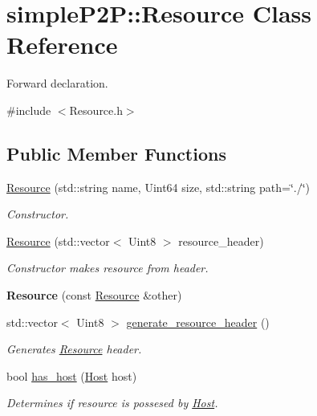 \hypertarget{classsimpleP2P_1_1Resource}{}\section{simple\+P2P\+:\+:Resource Class Reference}
\label{classsimpleP2P_1_1Resource}


Forward declaration.  




{\ttfamily \#include $<$Resource.\+h$>$}

\subsection*{Public Member Functions}
\begin{DoxyCompactItemize}
\item 
\hyperlink{classsimpleP2P_1_1Resource_a0aed54e6cf7d3a5fa2c53fe3b3b57d19}{Resource} (std\+::string name, Uint64 size, std\+::string path=\char`\"{}./\char`\"{})
\begin{DoxyCompactList}\small\item\em Constructor. \end{DoxyCompactList}\item 
\hyperlink{classsimpleP2P_1_1Resource_aa725d8f5028c2f83a088a18bcbd9318d}{Resource} (std\+::vector$<$ Uint8 $>$ resource\+\_\+header)
\begin{DoxyCompactList}\small\item\em Constructor makes resource from header. \end{DoxyCompactList}\item 
\mbox{\label{classsimpleP2P_1_1Resource_a39adea0f6c8614485c8f1bae9dfe366c}} 
{\bfseries Resource} (const \hyperlink{classsimpleP2P_1_1Resource}{Resource} \&other)
\item 
std\+::vector$<$ Uint8 $>$ \hyperlink{classsimpleP2P_1_1Resource_a87e735b9e7b48c329698c6e7aab455a8}{generate\+\_\+resource\+\_\+header} ()
\begin{DoxyCompactList}\small\item\em Generates \hyperlink{classsimpleP2P_1_1Resource}{Resource} header. \end{DoxyCompactList}\item 
bool \hyperlink{classsimpleP2P_1_1Resource_ac3c067c66ef0db0a25a7904a83f50e3d}{has\+\_\+host} (\hyperlink{classsimpleP2P_1_1Host}{Host} host)
\begin{DoxyCompactList}\small\item\em Determines if resource is possesed by \hyperlink{classsimpleP2P_1_1Host}{Host}. \end{DoxyCompactList}\item 

\end{DoxyCompactItemize}
